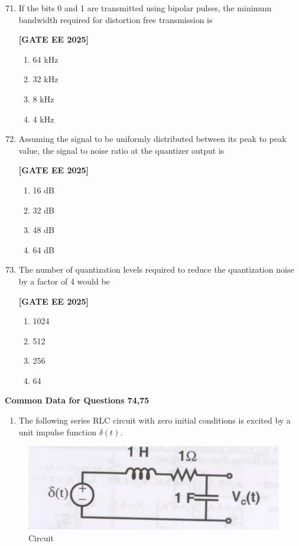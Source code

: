 \documentclass[12pt]{article}
\begin{document}
\begin{enumerate}[leftmargin=*, label=\textbf{Q.\arabic*:}]
\setcounter{enumi}{70}

\item If the bits 0 and 1 are transmitted using bipolar pulses, the minimum bandwidth required for distortion free transmission is
 
\noindent \textbf{[GATE EE 2025]}
\begin{enumerate}
  \item 64 kHz
  \item 32 kHz
  \item 8 kHz
  \item 4 kHz
\end{enumerate}

\item Assuming the signal to be uniformly distributed between its peak to peak value, the signal to noise ratio at the quantizer output is
 
\noindent \textbf{[GATE EE 2025]}
\begin{enumerate}
  \item 16 dB
  \item 32 dB
  \item 48 dB
  \item 64 dB
\end{enumerate}

\item The number of quantization levels required to reduce the quantization noise by a factor of 4 would be
 
\noindent \textbf{[GATE EE 2025]}
\begin{enumerate}
  \item 1024
  \item 512
  \item 256
  \item 64
\end{enumerate}

\end{enumerate}


 \large \textbf {Common Data for Questions 74,75}


\begin{enumerate}
\item The following series RLC circuit with zero initial conditions is excited by a unit impulse function $\delta(t)$.
\end{enumerate}
 
\begin{figure}[H]\centering
\includegraphics[width=0.6\columnwidth]{figs/q7475.png}
\caption{Circuit}
\label{fig:q7475}
\end{figure}
\end{document}
